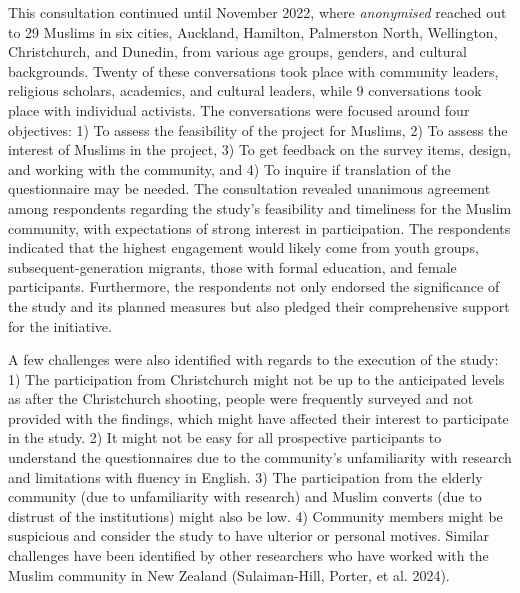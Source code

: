\documentclass[
]{interact}
\begin{document}
This consultation continued until November 2022, where \emph{anonymised}
reached out to 29 Muslims in six cities, Auckland, Hamilton, Palmerston
North, Wellington, Christchurch, and Dunedin, from various age groups,
genders, and cultural backgrounds. Twenty of these conversations took
place with community leaders, religious scholars, academics, and
cultural leaders, while 9 conversations took place with individual
activists. The conversations were focused around four objectives: 1) To
assess the feasibility of the project for Muslims, 2) To assess the
interest of Muslims in the project, 3) To get feedback on the survey
items, design, and working with the community, and 4) To inquire if
translation of the questionnaire may be needed. The consultation
revealed unanimous agreement among respondents regarding the study's
feasibility and timeliness for the Muslim community, with expectations
of strong interest in participation. The respondents indicated that the
highest engagement would likely come from youth groups,
subsequent-generation migrants, those with formal education, and female
participants. Furthermore, the respondents not only endorsed the
significance of the study and its planned measures but also pledged
their comprehensive support for the initiative.

A few challenges were also identified with regards to the execution of
the study: 1) The participation from Christchurch might not be up to the
anticipated levels as after the Christchurch shooting, people were
frequently surveyed and not provided with the findings, which might have
affected their interest to participate in the study. 2) It might not be
easy for all prospective participants to understand the questionnaires
due to the community's unfamiliarity with research and limitations with
fluency in English. 3) The participation from the elderly community (due
to unfamiliarity with research) and Muslim converts (due to distrust of
the institutions) might also be low. 4) Community members might be
suspicious and consider the study to have ulterior or personal motives.
Similar challenges have been identified by other researchers who have
worked with the Muslim community in New Zealand (Sulaiman-Hill, Porter,
et al. 2024).
\end{document}
